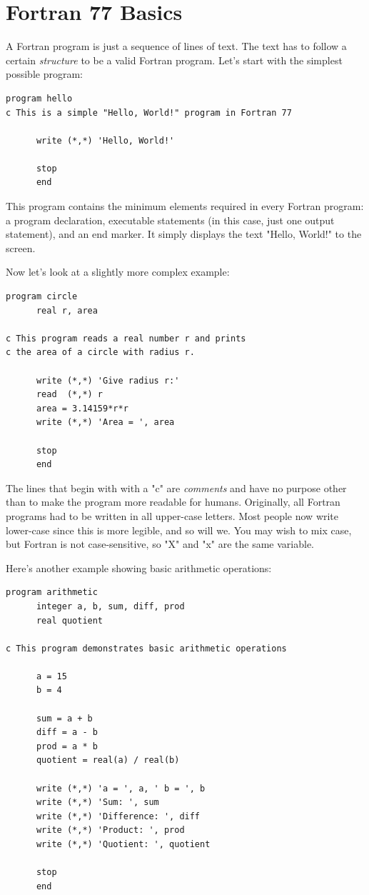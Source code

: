 \chapter{Fortran 77 Basics}

A Fortran program is just a sequence of lines of text. The text has to follow a certain \emph{structure} to be a valid Fortran program. Let's start with the simplest possible program:

\begin{lstlisting}[style=fortran77]
      program hello
c This is a simple "Hello, World!" program in Fortran 77
      
      write (*,*) 'Hello, World!'
      
      stop
      end
\end{lstlisting}

This program contains the minimum elements required in every Fortran program: a program declaration, executable statements (in this case, just one output statement), and an end marker. It simply displays the text "Hello, World!" to the screen.

Now let's look at a slightly more complex example:

\begin{lstlisting}[style=fortran77]
      program circle
      real r, area
 
c This program reads a real number r and prints
c the area of a circle with radius r.
 
      write (*,*) 'Give radius r:'
      read  (*,*) r
      area = 3.14159*r*r
      write (*,*) 'Area = ', area
 
      stop
      end
\end{lstlisting}

The lines that begin with with a "c" are \emph{comments} and have no purpose other than to make the program more readable for humans. Originally, all Fortran programs had to be written in all upper-case letters. Most people now write lower-case since this is more legible, and so will we. You may wish to mix case, but Fortran is not case-sensitive, so "X" and "x" are the same variable.

Here's another example showing basic arithmetic operations:

\begin{lstlisting}[style=fortran77]
      program arithmetic
      integer a, b, sum, diff, prod
      real quotient
      
c This program demonstrates basic arithmetic operations
      
      a = 15
      b = 4
      
      sum = a + b
      diff = a - b
      prod = a * b
      quotient = real(a) / real(b)
      
      write (*,*) 'a = ', a, ' b = ', b
      write (*,*) 'Sum: ', sum
      write (*,*) 'Difference: ', diff
      write (*,*) 'Product: ', prod
      write (*,*) 'Quotient: ', quotient
      
      stop
      end
\end{lstlisting}

